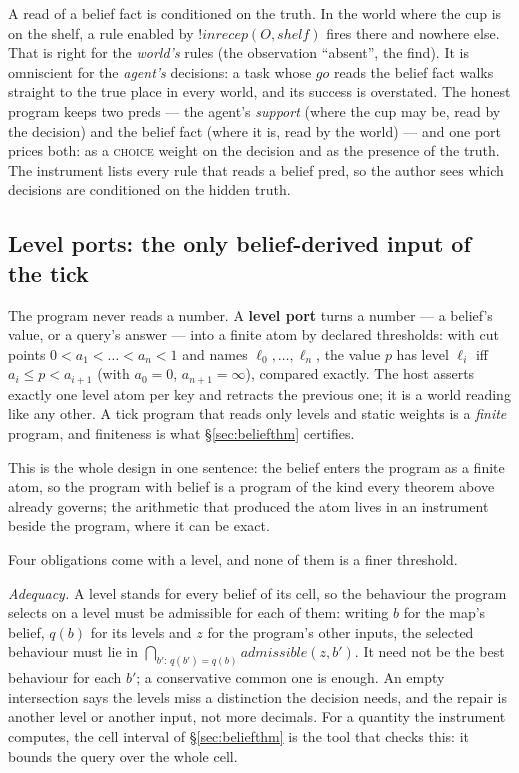 \documentclass[11pt]{article}
\newcommand{\bang}{\mathord{!}}
\theoremstyle{plain}
\theoremstyle{definition}
\theoremstyle{remark}
\begin{document}
A read of a belief fact is conditioned on the truth. In the world where
the cup is on the shelf, a rule enabled by $\bang\mathit{inrecep}(O,
\mathit{shelf})$ fires there and nowhere else. That is right for the
\emph{world's} rules (the observation ``absent'', the find). It is
omniscient for the \emph{agent's} decisions: a task whose $\mathit{go}$
reads the belief fact walks straight to the true place in every world,
and its success is overstated. The honest program keeps two preds ---
the agent's \emph{support} (where the cup may be, read by the decision)
and the belief fact (where it is, read by the world) --- and one port
prices both: as a \textsc{choice} weight on the decision and as the
presence of the truth. The instrument lists every rule that reads a
belief pred, so the author sees which decisions are conditioned on the
hidden truth.

\subsection{Level ports: the only belief-derived input of the tick}
\label{sec:levels}

The program never reads a number. A \textbf{level port} turns a number
--- a belief's value, or a query's answer --- into a finite atom by
declared thresholds: with cut points $0 < a_1 < \dots < a_n < 1$ and
names $\ell_0, \dots, \ell_n$, the value $p$ has level $\ell_i$ iff
$a_i \le p < a_{i+1}$ (with $a_0 = 0$, $a_{n+1} = \infty$), compared
exactly. The host asserts exactly one level atom per key and retracts
the previous one; it is a world reading like any other. A tick program
that reads only levels and static weights is a \emph{finite} program,
and finiteness is what \S\ref{sec:beliefthm} certifies.

This is the whole design in one sentence: the belief enters the
program as a finite atom, so the program with belief is a program of the
kind every theorem above already governs; the arithmetic that produced
the atom lives in an instrument beside the program, where it can be
exact.

Four obligations come with a level, and none of them is a finer
threshold.

\emph{Adequacy.} A level stands for every belief of its cell, so the
behaviour the program selects on a level must be admissible for each of
them: writing $b$ for the map's belief, $q(b)$ for its levels and $z$
for the program's other inputs, the selected behaviour must lie in
$\bigcap_{b' :\, q(b') = q(b)} \mathit{admissible}(z, b')$. It need not
be the best behaviour for each $b'$; a conservative common one is
enough. An empty intersection says the levels miss a distinction the
decision needs, and the repair is another level or another input, not
more decimals. For a quantity the instrument computes, the cell
interval of \S\ref{sec:beliefthm} is the tool that checks this: it
bounds the query over the whole cell.
\end{document}
